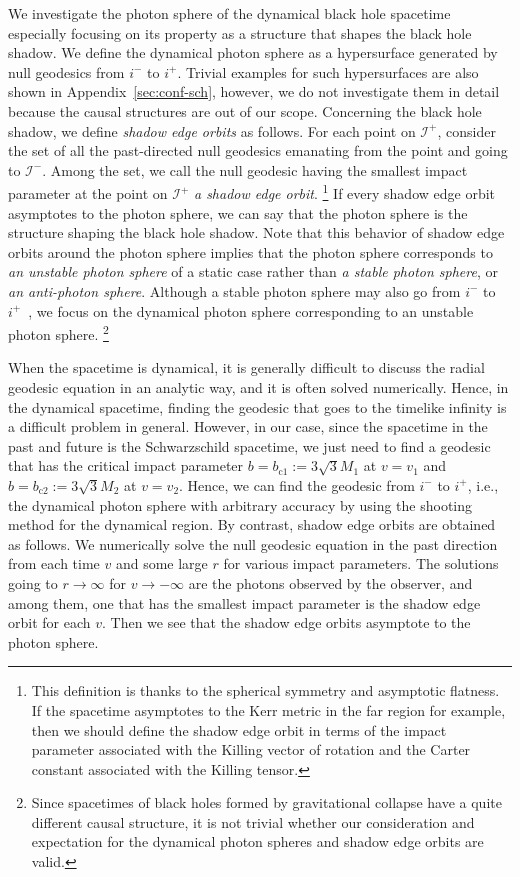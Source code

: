 \documentclass[prd,showpacs,preprintnumbers,groupedaddress,superscriptaddress,nofootinbib,11pt]{revtex4-1} %
\theoremstyle{newplain}
\newcommand{\mr}[1]{\mathrm{#1}}
\begin{document}
\par
We investigate the photon sphere of the dynamical black hole spacetime especially focusing on its property as a structure that shapes the black hole shadow.
We define the dynamical photon sphere as a hypersurface generated by null geodesics from $i^-$ to $i^+$.
Trivial examples for such hypersurfaces are also shown in Appendix~\ref{sec:conf-sch}, however, we do not investigate them in detail because the causal structures are out of our scope.
Concerning the black hole shadow, we define {\it shadow edge orbits} as follows.
For each point on $\mathscr{I}^+$, consider the set of all the past-directed null geodesics emanating from the point and going to $\mathscr{I}^-$.
Among the set, we call the null geodesic having the smallest impact parameter at the point on $\mathscr{I}^+$ {\it a shadow edge orbit}.
\footnote{
This definition is thanks to the spherical symmetry and asymptotic flatness.
If the spacetime asymptotes to the Kerr metric in the far region for example, then we should define the shadow edge orbit in terms of the impact parameter associated with the Killing vector of rotation and the Carter constant associated with the Killing tensor.
}
If every shadow edge orbit asymptotes to the photon sphere, we can say that the photon sphere is the structure shaping the black hole shadow.
Note that this behavior of shadow edge orbits around the photon sphere implies that the photon sphere corresponds to {\it an unstable photon sphere} of a static case rather than {\it a stable photon sphere}, or {\it an anti-photon sphere}.
Although a stable photon sphere may also go from $i^-$ to $i^+$~\cite{gibbons_2016}, we focus on the dynamical photon sphere corresponding to an unstable photon sphere. 
\footnote{Since spacetimes of black holes formed by gravitational collapse have a quite different causal structure, it is not trivial whether our consideration and expectation for the dynamical photon spheres and shadow edge orbits are valid.}


When the spacetime is dynamical, it is generally difficult to discuss the radial geodesic equation in an analytic way, and it is often solved numerically. 
Hence, in the dynamical spacetime, finding the geodesic that goes to the timelike infinity is a difficult problem in general. 
However, in our case, since the spacetime in the past and future is the Schwarzschild spacetime, we just need to find a geodesic that has the critical impact parameter $b=b_{\mr{c}1}:=3\sqrt{3}M_1$ at $v=v_1$ and $b=b_{\mr{c}2}:=3\sqrt{3}M_2$ at $v=v_2$. Hence, we can find the geodesic from $i^-$ to $i^+$, i.e., the dynamical photon sphere with arbitrary accuracy by using the shooting method for the dynamical region.
By contrast, shadow edge orbits are obtained as follows. We numerically solve the null geodesic equation in the past direction from each time $v$ and some large $r$ for various impact parameters. The solutions going to $r\to \infty$ for $v\to -\infty$ are the photons observed by the observer, and among them, one that has the smallest impact parameter is the shadow edge orbit for each $v$. Then we see that the shadow edge orbits asymptote to the photon sphere.
\end{document}
